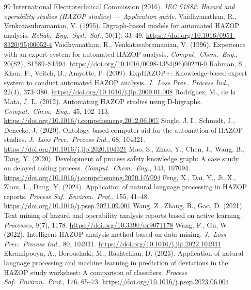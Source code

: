 \documentclass[10pt,twocolumn,a4paper]{extarticle}
\begin{document}
\begin{thebibliography}{99}\scriptsize
\setlength{\itemsep}{0pt}\setlength{\parskip}{0pt}
 International Electrotechnical Commission (2016). \emph{IEC 61882: Hazard and operability studies (HAZOP studies) --- Application guide.}
 Vaidhyanathan, R., Venkatasubramanian, V. (1995). Digraph-based models for automated HAZOP analysis. \emph{Reliab.\ Eng.\ Syst.\ Saf.}, 50(1), 33--49. \url{https://doi.org/10.1016/0951-8320(95)00052-4}
 Vaidhyanathan, R., Venkatasubramanian, V. (1996). Experience with an expert system for automated HAZOP analysis. \emph{Comput.\ Chem.\ Eng.}, 20(S2), S1589--S1594. \url{https://doi.org/10.1016/0098-1354(96)00270-0}
 Rahman, S., Khan, F., Veitch, B., Amyotte, P. (2009). ExpHAZOP+: Knowledge-based expert system to conduct automated HAZOP analysis. \emph{J.\ Loss Prev.\ Process Ind.}, 22(4), 373--380. \url{https://doi.org/10.1016/j.jlp.2009.01.008}
 Rodr{\'i}guez, M., de la Mata, J. L. (2012). Automating HAZOP studies using D-higraphs. \emph{Comput.\ Chem.\ Eng.}, 45, 102--113. \url{https://doi.org/10.1016/j.compchemeng.2012.06.007}
 Single, J. I., Schmidt, J., Denecke, J. (2020). Ontology-based computer aid for the automation of HAZOP studies. \emph{J.\ Loss Prev.\ Process Ind.}, 68, 104321. \url{https://doi.org/10.1016/j.jlp.2020.104321}
 Mao, S., Zhao, Y., Chen, J., Wang, B., Tang, Y. (2020). Development of process safety knowledge graph: A case study on delayed coking process. \emph{Comput.\ Chem.\ Eng.}, 143, 107094. \url{https://doi.org/10.1016/j.compchemeng.2020.107094}
 Feng, X., Dai, Y., Ji, X., Zhou, L., Dang, Y. (2021). Application of natural language processing in HAZOP reports. \emph{Process Saf.\ Environ.\ Prot.}, 155, 41--48. \url{https://doi.org/10.1016/j.psep.2021.09.001}
 Wang, Z., Zhang, B., Gao, D. (2021). Text mining of hazard and operability analysis reports based on active learning. \emph{Processes}, 9(7), 1178. \url{https://doi.org/10.3390/pr9071178}
 Wang, F., Gu, W. (2022). Intelligent HAZOP analysis method based on data mining. \emph{J.\ Loss Prev.\ Process Ind.}, 80, 104911. \url{https://doi.org/10.1016/j.jlp.2022.104911}
 Ekramipooya, A., Boroushaki, M., Rashtchian, D. (2023). Application of natural language processing and machine learning in prediction of deviations in the HAZOP study worksheet: A comparison of classifiers. \emph{Process Saf.\ Environ.\ Prot.}, 176, 65--73. \url{https://doi.org/10.1016/j.psep.2023.06.004}

\end{thebibliography}
\end{document}
